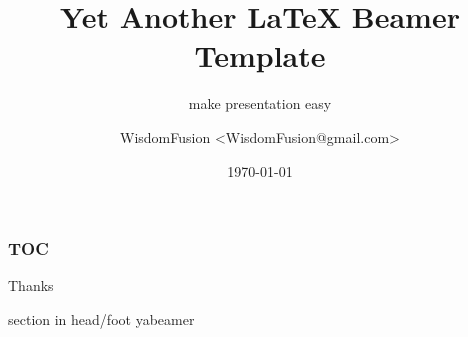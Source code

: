 \documentclass{beamer}
\title[yabeamer]{Yet Another LaTeX Beamer Template}
\subtitle{make presentation easy}
\author[WisdomFusion]{WisdomFusion <WisdomFusion@gmail.com>}
\date{\today}
\begin{document}
\begin{frame}
  \titlepage
\end{frame}

\begin{frame}
  \frametitle{TOC}

  \tableofcontents
\end{frame}

\begin{frame}[plain, b]
  \centering
  \huge Thanks
  \normalsize

  \vspace*{\fill}

  \begin{beamercolorbox}[wd=\paperwidth]{section in head/foot}
    \centering
    yabeamer
    \vskip10pt
  \end{beamercolorbox}
  
\end{frame}
\end{document}

